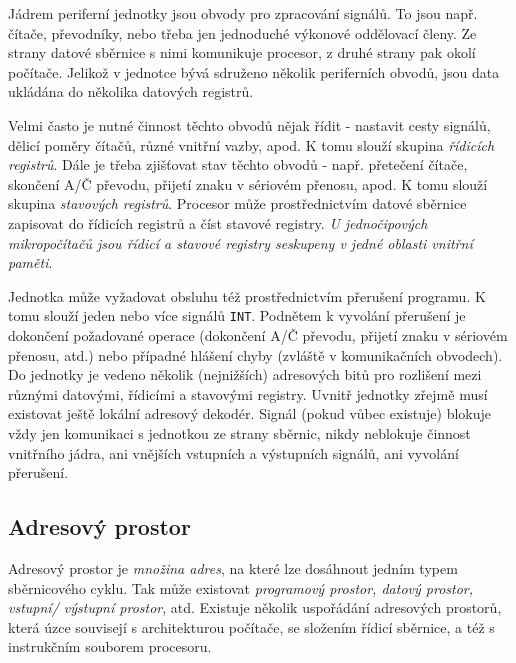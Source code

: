       
      Jádrem periferní jednotky jsou obvody pro zpracování signálů. To jsou např. čítače,
      převodníky, nebo třeba jen jednoduché výkonové oddělovací členy. Ze strany datové sběrnice s
      nimi komunikuje procesor, z druhé strany pak okolí počítače. Jelikož v jednotce bývá sdruženo
      několik periferních obvodů, jsou data ukládána do několika datových registrů.
      
      Velmi často je nutné činnost těchto obvodů nějak řídit - nastavit cesty signálů, dělicí poměry
      čítačů, různé vnitřní vazby, apod. K tomu slouží skupina \emph{řídicích registrů}. Dále je
      třeba zjišťovat stav těchto obvodů - např. přetečení čítače, skončení A/Č převodu, přijetí
      znaku v sériovém přenosu, apod. K tomu slouží skupina \emph{stavových registrů}. Procesor může
      prostřednictvím datové sběrnice zapisovat do řídicích registrů a číst stavové registry.
      \emph{U jednočipových mikropočítačů jsou řídicí a stavové registry seskupeny v jedné oblasti
      vnitřní paměti}.
      
      Jednotka může vyžadovat obsluhu též prostřednictvím přerušení programu. K tomu slouží jeden 
      nebo více signálů \texttt{INT}. Podnětem k vyvolání přerušení je dokončení požadované operace 
      (dokončení A/Č převodu, přijetí znaku v sériovém přenosu, atd.) nebo případné hlášení chyby 
      (zvláště v komunikačních obvodech). Do jednotky je vedeno několik (nejnižších) adresových 
      bitů pro rozlišení mezi různými datovými, řídicími a stavovými registry. Uvnitř jednotky 
      zřejmě musí existovat ještě lokální adresový dekodér. Signál  
      (pokud vůbec existuje) blokuje vždy jen komunikaci s jednotkou ze strany sběrnic, nikdy 
      neblokuje činnost vnitřního jádra, ani vnějších vstupních a výstupních signálů, ani vyvolání 
      přerušení.
      
    \subsection{Adresový prostor}\label{ces:IchapIVsecIssecIII}
      Adresový prostor je \emph{množina adres}, na které lze dosáhnout jedním typem sběrnicového 
      cyklu. Tak může existovat \emph{programový prostor, datový prostor, vstupní/ výstupní 
      prostor}, atd. Existuje několik uspořádání adresových prostorů, která úzce souvisejí s 
      architekturou počítače, se složením řídicí sběrnice, a též s instrukčním souborem procesoru.
      
